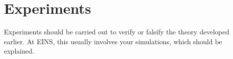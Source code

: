 \chapter{Experiments}
Experiments should be carried out to verify or falsify the theory developed earlier. At EINS, this usually involves your simulations, which should be explained.